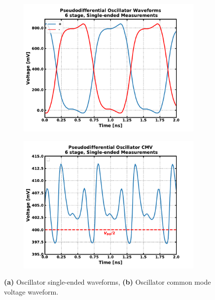 			\begin{figure}[htb!]
			    \centering
			    \begin{subfigure}{0.5\textwidth}
			        \centering
			        \includegraphics[width=1\textwidth, angle=0]{./figs/results/osc_se_waves}
			        \caption{ }
			        \label{fig:osc_se_waves}
			    \end{subfigure}%
			    \begin{subfigure}{0.5\textwidth}
			        \centering
			        \includegraphics[width=1\textwidth, angle=0]{./figs/results/osc_cmv}
			        \caption{ }
			        \label{fig:osc_cmv}
			    \end{subfigure}
			    \label{fig:osc_waves}
			    \caption{\textbf{(a)} Oscillator single-ended waveforms, \textbf{(b)} Oscillator common mode voltage waveform.}
			\end{figure} 



